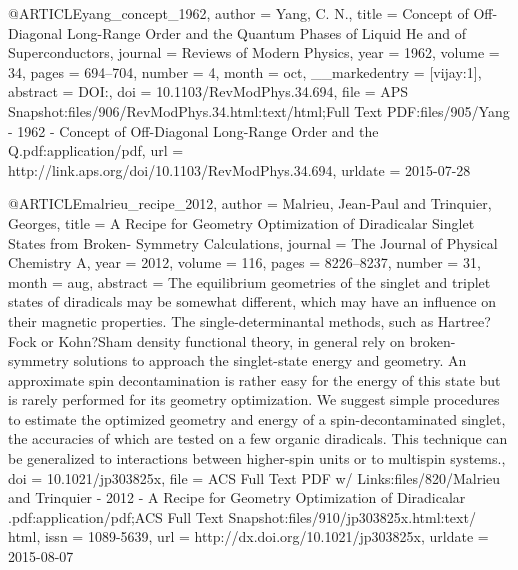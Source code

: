 @ARTICLE{yang_concept_1962,
  author = {Yang, C. N.},
  title = {Concept of {Off}-{Diagonal} {Long}-{Range} {Order} and the {Quantum}
	{Phases} of {Liquid} {He} and of {Superconductors}},
  journal = {Reviews of Modern Physics},
  year = {1962},
  volume = {34},
  pages = {694--704},
  number = {4},
  month = oct,
  __markedentry = {[vijay:1]},
  abstract = {DOI:},
  doi = {10.1103/RevModPhys.34.694},
  file = {APS Snapshot:files/906/RevModPhys.34.html:text/html;Full Text PDF:files/905/Yang - 1962 -       Concept of Off-Diagonal Long-Range Order and the Q.pdf:application/pdf},
  url = {http://link.aps.org/doi/10.1103/RevModPhys.34.694},
  urldate = {2015-07-28}
}

@ARTICLE{malrieu_recipe_2012,
  author = {Malrieu, Jean-Paul and Trinquier, Georges},
  title = {A {Recipe} for {Geometry} {Optimization} of {Diradicalar} {Singlet}
	{States} from {Broken}- {Symmetry} {Calculations}},
  journal = {The Journal of Physical Chemistry A},
  year = {2012},
  volume = {116},
  pages = {8226--8237},
  number = {31},
  month = aug,
  abstract = {The equilibrium geometries of the singlet and triplet states of diradicals
	may be somewhat different, which may have an influence on their magnetic
	properties. The single-determinantal methods, such as Hartree?Fock
	or Kohn?Sham density functional theory, in general rely on broken-symmetry
	solutions to approach the singlet-state energy and geometry. An approximate
	spin decontamination is rather easy for the energy of this state
	but is rarely performed for its geometry optimization. We suggest
	simple procedures to estimate the optimized geometry and energy of
	a spin-decontaminated singlet, the accuracies of which are tested
	on a few organic diradicals. This technique can be generalized to
	interactions between higher-spin units or to multispin systems.},
  doi = {10.1021/jp303825x},
  file = {ACS Full Text PDF w/ Links:files/820/Malrieu and Trinquier - 2012 - A Recipe for Geometry       Optimization of Diradicalar .pdf:application/pdf;ACS Full Text Snapshot:files/910/jp303825x.html:text/    html},
  issn = {1089-5639},
  url = {http://dx.doi.org/10.1021/jp303825x},
  urldate = {2015-08-07}
}

